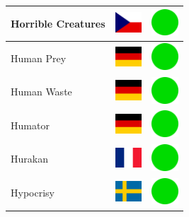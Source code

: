 \documentclass[12pt, a4paper, twoside]{report}
\begin{document}
\begin{center}
\begin{longtable}{|p{5cm}|p{2cm}|p{2cm}|}
Horrible Creatures & \includegraphics[width=1cm]{4x3/cz} & \includegraphics[width=1cm]{likes/y} \\ \hline
Human Prey & \includegraphics[width=1cm]{4x3/de} & \includegraphics[width=1cm]{likes/y} \\ \hline
Human Waste & \includegraphics[width=1cm]{4x3/de} & \includegraphics[width=1cm]{likes/y} \\ \hline
Humator & \includegraphics[width=1cm]{4x3/de} & \includegraphics[width=1cm]{likes/y} \\ \hline
Hurakan & \includegraphics[width=1cm]{4x3/fr} & \includegraphics[width=1cm]{likes/y} \\ \hline
Hypocrisy & \includegraphics[width=1cm]{4x3/se} & \includegraphics[width=1cm]{likes/y} \\ \hline

\end{longtable}
\end{center}
\end{document}
